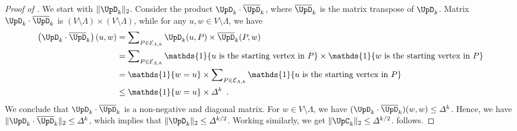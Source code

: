 \documentclass[11pt,reqno]{amsart}
\numberwithin{equation}{section}
\newcommand{\cE}{{\mathcal{E}}}
\newcommand{\blue}[1]{{\color{blue}#1}}
\newcommand{\bluepigment}[1]{{\color{blue(pigment)}#1}}
\newcommand{\goldenbrown}[1]{{\color{goldenbrown}#1}}
\newcommand{\iris}[1]{{\color{iris}#1}}
\newcommand{\red}[1]{{\color{red}#1}}
\newcommand{\Ind}{\mathds{1}}
\newcommand{\maxDeg}{{\Delta}}
\newcommand{\ExtV}{\iris{\cE}}
\newcommand{\norm}[2]{\goldenbrown{\|} #1 \goldenbrown{\|}_{#2}}
\newcommand{\MTR}[1]{\overline{#1}}
\newcommand{\VToEdge}{\UpD}
\newcommand{\EdgeToV}{\UpC}
\renewcommand{\blue}[1]{#1}
\renewcommand{\bluepigment}[1]{#1}
\renewcommand{\goldenbrown}[1]{#1}
\renewcommand{\iris}[1]{#1}
\renewcommand{\red}[1]{#1}
\newcommand{\kk}{\bluepigment{k}}
\newcommand{\kP}{\goldenbrown{P}}
\newcommand{\ku}{\red{u}}
\newcommand{\kw}{\blue{w}}
\renewcommand{\kk}{k}
\renewcommand{\kP}{P}
\renewcommand{\ku}{u}
\renewcommand{\kw}{w}
\begin{document}
\begin{proof}[Proof of ]%
We start with $\norm{ \VToEdge_{\kk}}{2}$. 
%
Consider the product $\VToEdge_{\kk} \cdot \MTR{\VToEdge}_{\kk}$, where $\MTR{\VToEdge}_{\kk}$ is the matrix transpose of $\VToEdge_{\kk}$. 
%
Matrix $\VToEdge_{\kk} \cdot \MTR{\VToEdge}_{\kk}$ is $(V\setminus \Lambda)\times (V\setminus \Lambda)$, while for  any $\ku,\kw\in V\setminus \Lambda$, we have 
\begin{align}
\left (\VToEdge_{\kk} \cdot \MTR{\VToEdge}_{\kk} \right)(\ku,\kw) 
& = \sum\nolimits_{\kP \in \ExtV_{\Lambda,\kk}} \VToEdge_{\kk}(\ku, \kP)\times \MTR{\VToEdge}_{\kk}(\kP, \kw) \nonumber\\
& = \sum\nolimits_{\kP \in \ExtV_{\Lambda,\kk}} \Ind\{\textrm{$\ku$ is the starting vertex in $\kP$} \} \times \Ind\{\textrm{$\kw$ is the starting vertex in $\kP$} \} \nonumber\\
& = \Ind\{ \kw=\ku\} \times \sum\nolimits_{\kP\in \ExtV_{\Lambda,\kk}} \Ind\{\textrm{$\ku$ is the starting vertex in $\kP$} \} \nonumber\\
&\leq \Ind\{ \kw=\ku\} \times \maxDeg^{\kk} \enspace. \nonumber
\end{align}
% 
We conclude that $\VToEdge_{\kk} \cdot \MTR{\VToEdge}_{\kk}$ is a non-negative and diagonal matrix. For $\kw\in V\setminus \Lambda$, we have 
$(\VToEdge_{\kk} \cdot \MTR{\VToEdge}_{\kk} )(\kw,\kw) \leq \maxDeg^{\kk}$. 
%
Hence, we have $ \norm{ \VToEdge_{\kk} \cdot \MTR{\VToEdge}_{\kk}}{2} \leq \maxDeg^{\kk}$, which implies that  $\norm{ \VToEdge_{\kk}}{2} \leq \maxDeg^{\kk/2}$.
%
Working similarly, we get $ \norm{ \EdgeToV_{\kk}}{2}\leq \maxDeg^{\kk/2}$.
  follows.
\end{proof}
\end{document}
